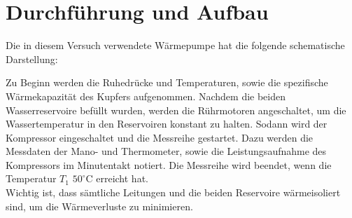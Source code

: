 \section{Durchführung und Aufbau}
\label{sec:Durchführung}

Die in diesem Versuch verwendete Wärmepumpe hat die folgende schematische Darstellung:


Zu Beginn werden die Ruhedrücke und Temperaturen, sowie die spezifische Wärmekapazität des Kupfers aufgenommen. Nachdem die beiden Wasserreservoire befüllt wurden, werden die Rührmotoren angeschaltet, um die Wassertemperatur in den Reservoiren konstant zu halten. Sodann wird der Kompressor eingeschaltet und die Messreihe gestartet. Dazu werden die Messdaten der Mano- und Thermometer, sowie die Leistungsaufnahme des Kompressors im Minutentakt notiert. Die Messreihe wird beendet, wenn die Temperatur $T_\text{1}$ $50^\circ \text{C}$ erreicht hat. \\
Wichtig ist, dass sämtliche Leitungen und die beiden Reservoire wärmeisoliert sind, um die Wärmeverluste zu minimieren.
